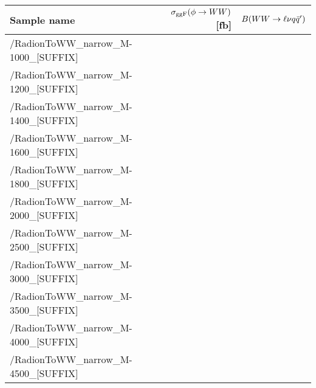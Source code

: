 \scriptsize
\begin{tabular}{lrr}
  \hline
  \textbf{Sample name} & $\sigma_{\mathrm{ggF}}(\phi\to WW)$ [fb] & $B(WW\to\ell\nu q\bar{q}')$ \\
  \hline
  \ttfamily /RadionToWW\_narrow\_M-1000\_[SUFFIX] &   \\
  \ttfamily /RadionToWW\_narrow\_M-1200\_[SUFFIX] &   \\
  \ttfamily /RadionToWW\_narrow\_M-1400\_[SUFFIX] &   \\
  \ttfamily /RadionToWW\_narrow\_M-1600\_[SUFFIX] &   \\
  \ttfamily /RadionToWW\_narrow\_M-1800\_[SUFFIX] &   \\
  \ttfamily /RadionToWW\_narrow\_M-2000\_[SUFFIX] &   \\
  \ttfamily /RadionToWW\_narrow\_M-2500\_[SUFFIX] &   \\
  \ttfamily /RadionToWW\_narrow\_M-3000\_[SUFFIX] &   \\
  \ttfamily /RadionToWW\_narrow\_M-3500\_[SUFFIX] &   \\
  \ttfamily /RadionToWW\_narrow\_M-4000\_[SUFFIX] &   \\
  \ttfamily /RadionToWW\_narrow\_M-4500\_[SUFFIX] &   \\
  \hline
\end{tabular}
